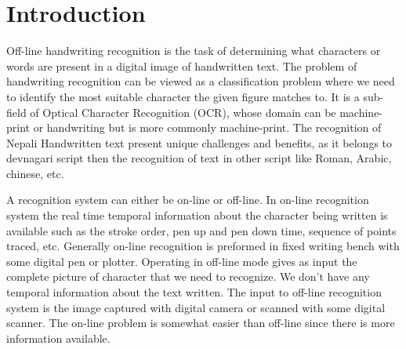 \documentclass[12pt,a4paper,oneside]{article}
\numberwithin{equation}{section}
\numberwithin{algorithm}{section}
\begin{document}
	
	
	\pagestyle{plain}
	
	\section{Introduction} \label{introduction}
	Off-line handwriting recognition is the task of determining what characters or words are present in a digital image of handwritten text. The problem of handwriting recognition can be viewed as a classification problem where we need to identify the most suitable character the given figure matches to. It is a sub-field of Optical Character Recognition (OCR), whose domain can be machine-print or handwriting but is more commonly machine-print. The recognition of Nepali Handwritten text present unique challenges and benefits, as it belongs to devnagari script then the recognition of text in other script like Roman, Arabic, chinese, etc.
	
	A recognition system can either be on-line or off-line. In on-line recognition system the real time temporal information about the character being written is available such as the stroke order, pen up and pen down time, sequence of points traced, etc. Generally on-line recognition is preformed in fixed writing bench with some digital pen or plotter.  Operating in off-line mode gives as input the complete picture of character that we need to recognize. We don't have any temporal information about the text written. The input to off-line recognition system is the image captured with digital camera or scanned with some digital scanner. The on-line problem is somewhat easier than off-line since there is more information available.
	
\end{document}
